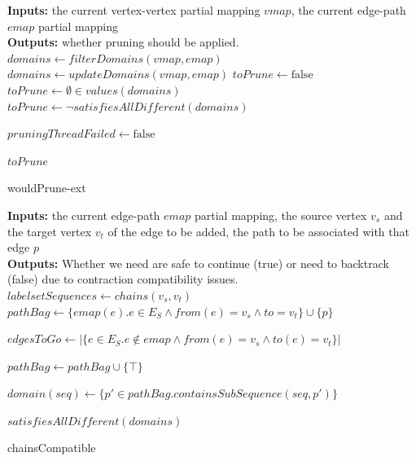 \begin{algorithm}
\SetAlgoLined
\LinesNumbered
\textbf{Inputs: } the current vertex-vertex partial mapping $\mathit{vmap}$, the current edge-path $\mathit{emap}$ partial mapping\\
\textbf{Outputs: } whether pruning should be applied.\\

\color{purple}
 {
	\color{black}
	$\mathit{domains} \longleftarrow \mathit{filterDomains}(\mathit{vmap}, \mathit{emap})$\;
}  {
	$\mathit{domains} \longleftarrow \mathit{updateDomains}(\mathit{vmap}, \mathit{emap})$\;
} 
\color{black}
$\mathit{toPrune} \longleftarrow \text{false}$\;
\color{purple}
 {\color{black}
	$\mathit{toPrune} \longleftarrow \emptyset \in \mathit{values}(\mathit{domains})$\;
}  {
	$\mathit{toPrune} \longleftarrow \lnot \mathit{satisfiesAllDifferent}(\mathit{domains})$\;
}

 {
	$\mathit{pruningThreadFailed} \longleftarrow \text{false}$\;
}

\color{black}
\Return $\mathit{toPrune}$\;
 \caption{wouldPrune-ext}
 \label{algorithm:wouldPrune-ext}
\end{algorithm}


\begin{algorithm}
\color{purple}
\SetAlgoLined
\LinesNumbered
\textbf{Inputs: } the current edge-path $\mathit{emap}$ partial mapping, the source vertex $v_s$ and the target vertex $v_t$ of the edge to be added, the path to be associated with that edge $p$\\
\textbf{Outputs: } Whether we need are safe to continue (true) or need to backtrack (false) due to contraction compatibility issues.\\
$\mathit{labelsetSequences} \longleftarrow \mathit{chains}(v_s, v_t)$\;
$\mathit{pathBag} \longleftarrow \{\mathit{emap}(e) . e \in E_S \land \mathit{from}(e)=v_s \land \mathit{to}=v_t \} \cup \{p\}$\;

$\mathit{edgesToGo} \longleftarrow |\{e \in E_S . e \not \in \mathit{emap} \land \mathit{from}(e)=v_s \land \mathit{to}(e)=v_t\}|$

 {
		$\mathit{pathBag}\longleftarrow \mathit{pathBag} \cup \{\top\}$\;	
}

 {
	$\mathit{domain}(\mathit{seq})\longleftarrow \{p' \in \mathit{pathBag} . \mathit{containsSubSequence}(\mathit{seq}, p')\}$\;
}

\Return $\mathit{satisfiesAllDifferent}(\mathit{domains})$\;

 \caption{chainsCompatible}
 \label{algorithm:chainsCompatible}
\end{algorithm}


